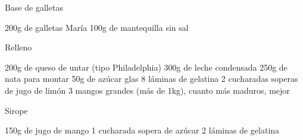 Base de galletas

200g de galletas María
100g de mantequilla sin sal


Relleno

200g de queso de untar (tipo Philadelphia)
300g de leche condensada
250g de nata para montar
50g de azúcar glas
8 láminas de gelatina
2 cucharadas soperas de jugo de limón
3 mangos grandes (más de 1kg), cuanto más maduros, mejor


Sirope

150g de jugo de mango
1 cucharada sopera de azúcar
2 láminas de gelatina
